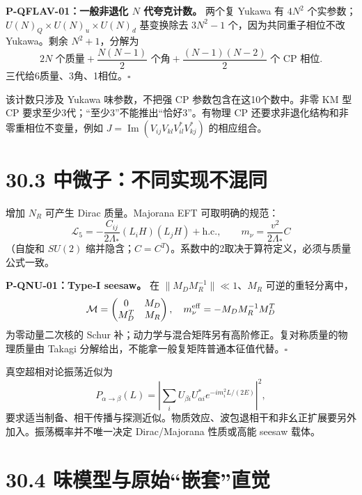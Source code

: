 \documentclass[
  11pt,
  oneside]{book}
\begin{document}
\protect\hypertarget{p-qflav-01}{}{}

\textbf{P-QFLAV-01：一般非退化 \(N\) 代夸克计数。} 两个复 Yukawa 有
\(4N^2\) 个实参数；\(U(N)_Q\times U(N)_u\times U(N)_d\) 基变换除去
\(3N^2-1\) 个，因为共同重子相位不改 Yukawa。剩余 \(N^2+1\)，分解为 \[
2N\text{ 个质量}+\frac{N(N-1)}2\text{ 个角}
+\frac{(N-1)(N-2)}2\text{ 个 CP 相位}.
\] 三代给6质量、3角、1相位。\(\square\)

该计数只涉及 Yukawa 味参数，不把强 CP 参数包含在这10个数中。非零 KM 型
CP 要求至少3代；``至少3''不能推出``恰好3''。有物理 CP
还要求非退化结构和非零重相位不变量，例如
\(J=\operatorname{Im}(V_{ij}V_{kl}V^*_{il}V^*_{kj})\) 的相应组合。

\hypertarget{ux4e2dux5faeux5b50ux4e0dux540cux5b9eux73b0ux4e0dux6df7ux540c}{%
\section{30.3
中微子：不同实现不混同}\label{ux4e2dux5faeux5b50ux4e0dux540cux5b9eux73b0ux4e0dux6df7ux540c}}

增加 \(N_R\) 可产生 Dirac 质量。Majorana EFT 可取明确的规范： \[
\mathcal L_5=-\frac{C_{ij}}{2\Lambda_*}(L_iH)(L_jH)+\mathrm{h.c.},
\qquad m_\nu=\frac{v^2}{2\Lambda_*}C
\] （自旋和 \(SU(2)\)
缩并隐含；\(C=C^T\)）。系数中的2取决于算符定义，必须与质量公式一致。

\protect\hypertarget{p-qnu-01}{}{}

\textbf{P-QNU-01：Type-I seesaw。} 在 \(\|M_D M_R^{-1}\|\ll1\)、\(M_R\)
可逆的重轻分离中， \[
\mathcal M=\begin{pmatrix}0&M_D\\M_D^T&M_R\end{pmatrix},
\quad m_\nu^{\rm eff}=-M_DM_R^{-1}M_D^T
\] 为零动量二次核的 Schur
补；动力学与混合矩阵另有高阶修正。复对称质量的物理质量由 Takagi
分解给出，不能拿一般复矩阵普通本征值代替。\(\square\)

真空超相对论振荡近似为 \[
P_{\alpha\to\beta}(L)=
\left|\sum_i U_{\beta i}U_{\alpha i}^*
e^{-im_i^2L/(2E)}\right|^2,
\]
要求适当制备、相干传播与探测近似。物质效应、波包退相干和非幺正扩展要另外加入。振荡概率并不唯一决定
Dirac/Majorana 性质或高能 seesaw 载体。

\hypertarget{ux5473ux6a21ux578bux4e0eux539fux59cbux5d4cux5957ux76f4ux89c9}{%
\section{30.4
味模型与原始``嵌套''直觉}\label{ux5473ux6a21ux578bux4e0eux539fux59cbux5d4cux5957ux76f4ux89c9}}
\end{document}
